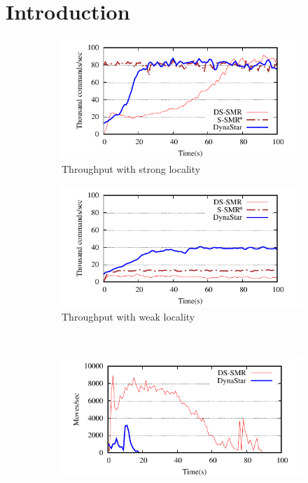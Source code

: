 \section{Introduction}


\begin{figure}[ht!]
  \centering
  \begin{subfigure}[b]{0.45\textwidth}
    \centering
    \includegraphics[width=0.95\columnwidth]{figures/socc/socc-tp-strong-locality}
    \caption{Throughput with strong locality}
  \end{subfigure}
  \begin{subfigure}[b]{0.45\textwidth}
    \centering
    \includegraphics[width=0.95\columnwidth]{figures/socc/socc-tp-weak-locality}
    \caption{Throughput with weak locality}
  \end{subfigure} \\
  \begin{subfigure}[b]{0.45\textwidth}
    \centering
    \includegraphics[width=0.95\columnwidth]{figures/socc/socc-moves-strong-locality}

\end{subfigure}
\end{figure}

